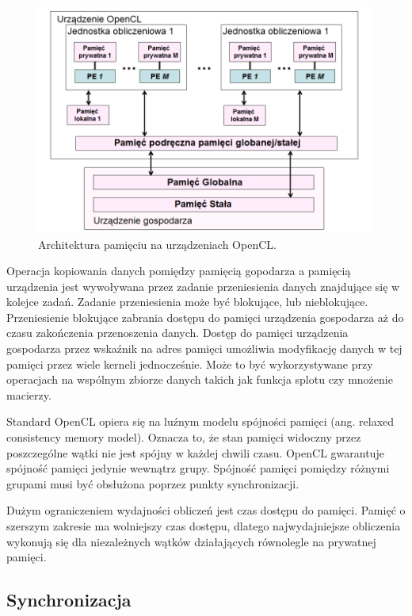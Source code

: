 \begin{figure}[h]
        \centering
                \centering
                \includegraphics[width=12cm]{architekturapamieci}
	\caption{Architektura pamięciu na urządzeniach OpenCL.}
\end{figure}

Operacja kopiowania danych pomiędzy pamięcią gopodarza a pamięcią urządzenia jest wywoływana przez zadanie przeniesienia danych znajdujące się w kolejce zadań. Zadanie przeniesienia może być blokujące, lub nieblokujące. Przeniesienie blokujące zabrania dostępu do pamięci urządzenia gospodarza aż do czasu zakończenia przenoszenia danych. Dostęp do pamięci urządzenia gospodarza przez wskaźnik na adres pamięci umożliwia modyfikację danych w tej pamięci przez wiele kerneli jednocześnie. Może to być wykorzystywane przy operacjach na wspólnym zbiorze danych takich jak funkcja splotu czy mnożenie macierzy.

Standard OpenCL opiera się na luźnym modelu spójności pamięci (ang. relaxed consistency memory model). Oznacza to, że stan pamięci widoczny przez poszczególne wątki nie jest spójny w każdej chwili czasu. OpenCL gwarantuje spójność pamięci jedynie wewnątrz grupy. Spójność pamięci pomiędzy różnymi grupami musi być obsłużona poprzez punkty synchronizacji.

Dużym ograniczeniem wydajności obliczeń jest czas dostępu do pamięci. Pamięć o szerszym zakresie ma wolniejszy czas dostępu, dlatego najwydajniejsze obliczenia wykonują się dla niezależnych wątków działających równolegle na prywatnej pamięci.


\subsection{Synchronizacja}\label{sec:OpenC61L}

